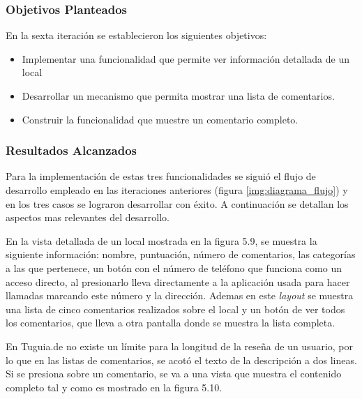 \subsubsection{Objetivos Planteados} 
En la sexta iteración se establecieron los siguientes objetivos:
\begin{itemize}
\item Implementar una funcionalidad que permite ver información detallada de un local
\item Desarrollar un mecanismo que permita mostrar una lista de comentarios.
\item Construir la funcionalidad que muestre un comentario completo.
\end{itemize}

\subsubsection{Resultados Alcanzados}

Para la implementación de estas tres funcionalidades se siguió el flujo de desarrollo empleado en las iteraciones anteriores (figura \ref{img:diagrama_flujo}) y en los tres casos se lograron desarrollar con éxito. A continuación se detallan los aspectos mas relevantes del desarrollo.

En la vista detallada de un local mostrada en la figura 5.9, se muestra la siguiente información: nombre, puntuación, número de comentarios, las categorías a las que pertenece, un botón con el número de teléfono que funciona como un acceso directo, al presionarlo lleva directamente a la aplicación usada para hacer llamadas marcando este número y la dirección. Ademas en este \textit{layout} se muestra una lista de cinco comentarios realizados sobre el local y un botón de ver todos los comentarios, que lleva a otra pantalla donde se muestra la lista completa.

En Tuguia.de no existe un límite para la longitud de la reseña de un usuario, por lo que en las listas de comentarios, se acotó el texto de la descripción a dos lineas. Si se presiona sobre un comentario, se va a una vista que muestra el contenido completo tal y como es mostrado en la figura 5.10.

